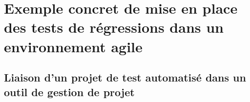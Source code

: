 \chapter[Exemple concret]{Exemple concret de mise en place des tests de régressions dans un environnement agile}
\label{chap:exemples}
\section{Liaison d'un projet de test automatisé dans un outil de gestion de projet}
